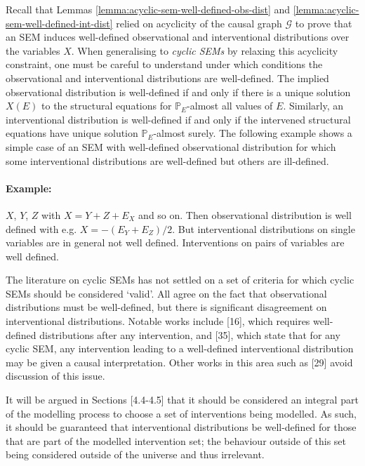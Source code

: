 Recall that Lemmas \ref{lemma:acyclic-sem-well-defined-obs-dist} and \ref{lemma:acyclic-sem-well-defined-int-dist} relied on acyclicity of the causal graph $\mathcal{G}$ to prove that an SEM induces well-defined observational and interventional distributions over the variables $X$. 
When generalising to \emph{cyclic SEMs} by relaxing this acyclicity constraint, one must be careful to understand under which conditions the observational and interventional distributions are well-defined.
The implied observational distribution is well-defined if and only if there is a unique solution $X(E)$ to the structural equations for $\mathbb{P}_E$-almost all values of $E$. Similarly, an interventional distribution is well-defined if and only if the intervened structural equations have unique solution $\mathbb{P}_E$-almost surely.
The following example shows a simple case of an SEM with well-defined observational distribution for which some interventional distributions are well-defined but others are ill-defined.

\paragraph{Example:} $X$, $Y$, $Z$ with $X = Y+Z+ E_X$ and so on. Then observational distribution is well defined with e.g. $X= -(E_Y + E_Z) / 2$. But interventional distributions on single variables are in general not well defined. Interventions on pairs of variables are well defined.

The literature on cyclic SEMs has not settled on a set of criteria for which cyclic SEMs should be considered `valid'. 
All agree on the fact that observational distributions must be well-defined, but there is significant disagreement on interventional distributions.
Notable works include [16], which requires well-defined distributions after any intervention, and [35], which state that for any cyclic SEM, any intervention leading to a well-defined interventional distribution may be given a causal interpretation. Other works in this area such as [29] avoid discussion of this issue.

It will be argued in Sections [4.4-4.5] that it should be considered an integral part of the modelling process to choose a set of interventions being modelled. As such, it should be guaranteed that interventional distributions be well-defined for those that are part of the modelled intervention set; the behaviour outside of this set being considered outside of the universe and thus irrelevant.

